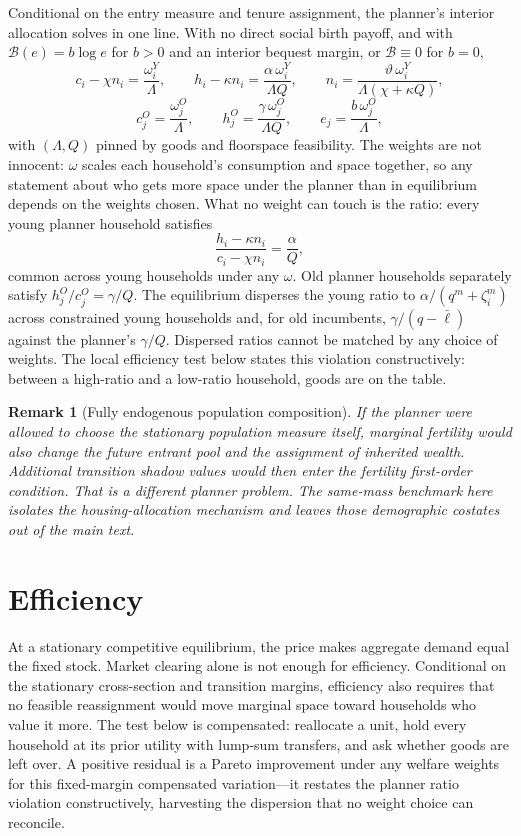 \documentclass[11pt]{article}
\newtheorem{remark}{Remark}
\newcommand{\1}{\mathbf 1}
\begin{document}
Conditional on the entry measure and tenure assignment, the planner's interior allocation solves in one line. With no direct social birth payoff, and with $\mathcal B(e)=b\log e$ for $b>0$ and an interior bequest margin, or $\mathcal B\equiv0$ for $b=0$,
\[
c_i-\chi n_i=\frac{\omega_i^Y}{\Lambda},
\qquad
h_i-\kappa n_i=\frac{\alpha\,\omega_i^Y}{\Lambda Q},
\qquad
n_i=\frac{\vartheta\,\omega_i^Y}{\Lambda(\chi+\kappa Q)},
\]
\[
c_j^O=\frac{\omega_j^O}{\Lambda},
\qquad
h_j^O=\frac{\gamma\,\omega_j^O}{\Lambda Q},
\qquad
e_j=\frac{b\,\omega_j^O}{\Lambda},
\]
with $(\Lambda,Q)$ pinned by goods and floorspace feasibility. The weights are not innocent: $\omega$ scales each household's consumption and space together, so any statement about who gets more space under the planner than in equilibrium depends on the weights chosen. What no weight can touch is the ratio: every young planner household satisfies
\[
\frac{h_i-\kappa n_i}{c_i-\chi n_i}=\frac{\alpha}{Q},
\]
common across young households under any $\omega$. Old planner households separately satisfy $h_j^O/c_j^O=\gamma/Q$. The equilibrium disperses the young ratio to $\alpha/(q^m+\zeta_i^m)$ across constrained young households and, for old incumbents, $\gamma/(q-\bar\ell)$ against the planner's $\gamma/Q$. Dispersed ratios cannot be matched by any choice of weights. The local efficiency test below states this violation constructively: between a high-ratio and a low-ratio household, goods are on the table.

\begin{remark}[Fully endogenous population composition]
If the planner were allowed to choose the stationary population measure itself, marginal fertility would also change the future entrant pool and the assignment of inherited wealth. Additional transition shadow values would then enter the fertility first-order condition. That is a different planner problem. The same-mass benchmark here isolates the housing-allocation mechanism and leaves those demographic costates out of the main text.
\end{remark}

\section{Efficiency}

At a stationary competitive equilibrium, the price makes aggregate demand equal the fixed stock. Market clearing alone is not enough for efficiency. Conditional on the stationary cross-section and transition margins, efficiency also requires that no feasible reassignment would move marginal space toward households who value it more. The test below is compensated: reallocate a unit, hold every household at its prior utility with lump-sum transfers, and ask whether goods are left over. A positive residual is a Pareto improvement under any welfare weights for this fixed-margin compensated variation---it restates the planner ratio violation constructively, harvesting the dispersion that no weight choice can reconcile.
\end{document}
